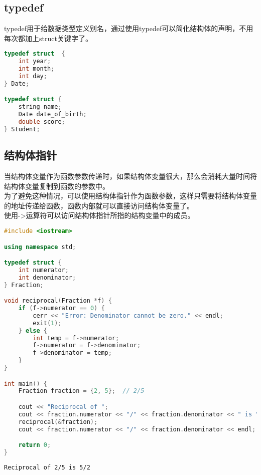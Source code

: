 \vspace{0.5cm}

\subsection{typedef}

typedef用于给数据类型定义别名，通过使用typedef可以简化结构体的声明，不用每次都加上struct关键字了。

\vspace{-0.5cm}
\begin{lstlisting}[language=C++]
typedef struct  {
    int year;
    int month;
    int day;
} Date;

typedef struct {
    string name;
    Date date_of_birth;
    double score;
} Student;
\end{lstlisting}

\vspace{0.5cm}

\subsection{结构体指针}

当结构体变量作为函数参数传递时，如果结构体变量很大，那么会消耗大量时间将结构体变量复制到函数的参数中。\\

为了避免这种情况，可以使用结构体指针作为函数参数，这样只需要将结构体变量的地址传递给函数，函数内部就可以直接访问结构体变量了。\\

使用->运算符可以访问结构体指针所指的结构变量中的成员。\\


\begin{lstlisting}[language=C++]
#include <iostream>

using namespace std;

typedef struct {
    int numerator;
    int denominator;
} Fraction;

void reciprocal(Fraction *f) {
    if (f->numerator == 0) {
        cerr << "Error: Denominator cannot be zero." << endl;
        exit(1);
    } else {
        int temp = f->numerator;
        f->numerator = f->denominator;
        f->denominator = temp;
    }
}

int main() {
    Fraction fraction = {2, 5};  // 2/5

    cout << "Reciprocal of ";
    cout << fraction.numerator << "/" << fraction.denominator << " is ";
    reciprocal(&fraction);
    cout << fraction.numerator << "/" << fraction.denominator << endl;

    return 0;
}
\end{lstlisting}

\begin{tcolorbox}
    \begin{verbatim}
Reciprocal of 2/5 is 5/2
	\end{verbatim}
\end{tcolorbox}

\newpage